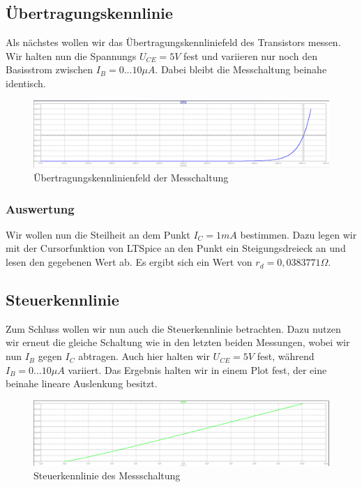 \documentclass{article}
\begin{document}
\subsection{Übertragungskennlinie}
\label{sec:ubertr}

Als nächstes wollen wir das Übertragungskennliniefeld des Transistors messen. Wir halten nun die Spannungs $U_{CE} = 5V$ fest und variieren nur noch den Basisstrom zwischen $I_{B} = 0...10\mu A$. Dabei bleibt die Messchaltung beinahe identisch.

\begin{figure}[h]
  \centering
  \includegraphics[width=\textwidth]{../assets/images/EL1P3/uebertragungskennlinie.png}
  \caption{Übertragungskennlinienfeld der Messchaltung}
  \label{fig:uebertragungskennlinie}
\end{figure}

\subsubsection{Auswertung}

Wir wollen nun die Steilheit an dem Punkt $I_{C} = 1mA$ bestimmen. Dazu legen wir mit der Cursorfunktion von LTSpice an den Punkt ein Steigungsdreieck an und lesen den gegebenen Wert ab. Es ergibt sich ein Wert von $r_{d} = 0,0383771\Omega$.

\newpage

\subsection{Steuerkennlinie}
\label{sec:steuerkennlinie}

Zum Schluss wollen wir nun auch die Steuerkennlinie betrachten. Dazu nutzen wir erneut die gleiche Schaltung wie in den letzten beiden Messungen, wobei wir nun $I_{B}$ gegen $I_{C}$ abtragen. Auch hier halten wir $U_{CE} = 5V$ fest, während $I_{B} = 0...10\mu A$ variiert. Das Ergebnis halten wir in einem Plot fest, der eine beinahe lineare Auslenkung besitzt.

\begin{figure}[h]
  \centering
  \includegraphics[width=\textwidth]{../assets/images/EL1P3/steuerkennlinie.png}
  \caption{Steuerkennlinie des Messschaltung}
  \label{fig:steuer}
\end{figure}
\end{document}
